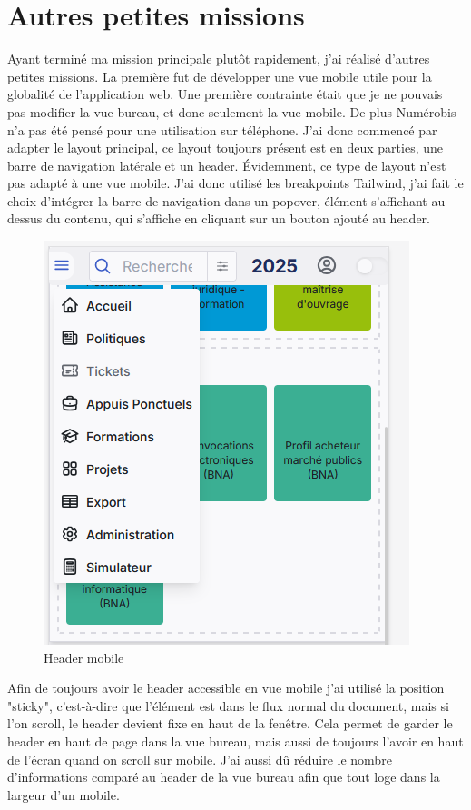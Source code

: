 \documentclass[a4paper,12pt]{report}
\begin{document}
\section{Autres petites missions}
Ayant terminé ma mission principale plutôt rapidement, j'ai réalisé d'autres petites missions. La première fut de développer une vue mobile utile pour la globalité de l'application web. Une première contrainte était que je ne pouvais pas modifier la vue bureau, et donc seulement la vue mobile. De plus Numérobis n'a pas été pensé pour une utilisation sur téléphone. J'ai donc commencé par adapter le layout principal, ce layout toujours présent est en deux parties, une barre de navigation latérale et un header. Évidemment, ce type de layout n'est pas adapté à une vue mobile. J'ai donc utilisé les breakpoints Tailwind, j'ai fait le choix d'intégrer la barre de navigation dans un popover, élément s'affichant au-dessus du contenu, qui s'affiche en cliquant sur un bouton ajouté au header.

\begin{figure}[H]
    \centering
    \includegraphics[scale=0.6]{headerMob.png}
    \caption{Header mobile}
    \label{fig:header-mob}
\end{figure}

Afin de toujours avoir le header accessible en vue mobile j'ai utilisé la position "sticky", c'est-à-dire que l'élément est dans le flux normal du document, mais si l'on scroll, le header devient fixe en haut de la fenêtre. Cela permet de garder le header en haut de page dans la vue bureau, mais aussi de toujours l'avoir en haut de l'écran quand on scroll sur mobile. J'ai aussi dû réduire le nombre d'informations comparé au header de la vue bureau afin que tout loge dans la largeur d'un mobile.
\end{document}
